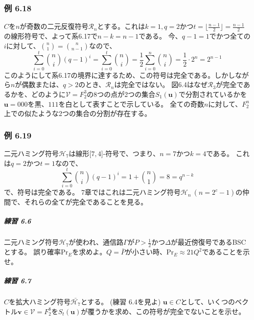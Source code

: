 \documentclass[12pt,a4paper]{article}
\begin{document}
    \subsubsection*{例 6.18}

      $C$を$n$が奇数の二元反復符号$\mathcal{R}_n$とする。これは$k = 1, q = 2$かつ$t = \lfloor \frac{n - 1}{2} \rfloor = \frac{n - 1}{2}$の線形符号で、よって系6.17で$n - k = n - 1$である。
      今、$q - 1 = 1$でかつ全ての$i$に対して、$\binom{n}{1} = \binom{n}{n - 1}$なので、
      $$ \sum_{i = 0}^t \binom{n}{i} {(q - 1)}^i = \sum_{i = 0}^t \binom{n}{i} = \frac{1}{2} \sum_{i = 0}^n \binom{n}{i} = \frac{1}{2} \cdot 2^n = 2^{n-1} $$
      このようにして系6.17の境界に達するため、この符号は完全である。しかしながら$n$が偶数または、$q > 2$のとき、$\mathcal{R}_n$は完全ではない。
      図6.4はなぜ$\mathcal{R}_3$が完全であるかを、どのように$\mathcal{V} = F_2^3$の8つの点が2つの集合$S_1(\mathbf{u})$で分割されているかを$\mathbf{u} = 000$を黒、$111$を白として表すことで示している。
      全ての奇数$n$に対して、$F_2^n$上での似たような2つの集合の分割が存在する。

    \subsubsection*{例 6.19}
      
      二元ハミング符号$\mathcal{H}_7$は線形$\lbrack 7, 4 \rbrack$-符号で、つまり、$n = 7$かつ$k = 4$である。
      これは$q = 2$かつ$t = 1$なので、
      $$ \sum_{i = 0}^t \binom{n}{i} {(q - 1)}^i = 1 + \binom{n}{1} = 8 = q^{n-k}$$
      で、符号は完全である。
      7章ではこれは二元ハミング符号$\mathcal{H}_n \ (n = 2^c - 1)$の仲間で、それらの全てが完全であることを見る。

      \subparagraph{練習 6.6}
        
        二元ハミング符号$\mathcal{H}_7$が使われ、通信路$\Gamma$が$P > \frac{1}{2}$かつ$\Delta$が最近傍復号であるBSCとする。
        誤り確率$\text{Pr}_E$を求めよ。$Q = \bar{P}$が小さい時、$\text{Pr}_E \approx 21Q^2$であることを示せ。

      \subparagraph{練習 6.7}
        
        $C$を拡大ハミング符号$\bar{\mathcal{H}_7}$とする。 (練習 6.4を見よ)
        $\mathbf{u} \in C$として、いくつのベクトル$\mathbf{v} \in \mathcal{V} = F_2^8$を$S_t(\mathbf{u})$が覆うかを求め、この符号が完全でないことを示せ。
\end{document}
